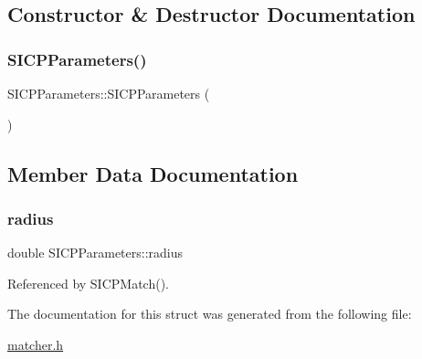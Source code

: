 \subsection{Constructor \& Destructor Documentation}
\mbox{\label{structSICPParameters_a441567a2596ba3857dc19cf178d829db}} 
\subsubsection{\texorpdfstring{S\+I\+C\+P\+Parameters()}{SICPParameters()}}
{\footnotesize\ttfamily S\+I\+C\+P\+Parameters\+::\+S\+I\+C\+P\+Parameters (\begin{DoxyParamCaption}{ }\end{DoxyParamCaption})\hspace{0.3cm}{\ttfamily [inline]}}



\subsection{Member Data Documentation}
\mbox{\label{structSICPParameters_abb46fdfaa6bf8d14556c2b75f0db5828}} 
\subsubsection{\texorpdfstring{radius}{radius}}
{\footnotesize\ttfamily double S\+I\+C\+P\+Parameters\+::radius}



Referenced by S\+I\+C\+P\+Match().



The documentation for this struct was generated from the following file\+:\begin{DoxyCompactItemize}
\item 
\hyperlink{matcher_8h}{matcher.\+h}\end{DoxyCompactItemize}
